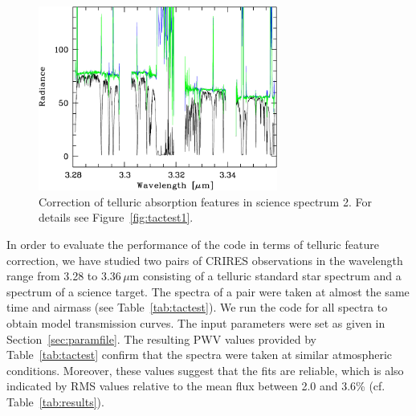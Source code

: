 \begin{figure}
\centering
\includegraphics[width=0.7\textwidth,clip=true]
{figures/mfd_tactest2.pdf}
\caption[]{Correction of telluric absorption features in science spectrum 2.
For details see Figure~\ref{fig:tactest1}.}
\label{fig:tactest2}
\end{figure}

In order to evaluate the performance of the code in terms of telluric feature
correction, we have studied two pairs of CRIRES observations in the wavelength
range from 3.28 to 3.36\,$\mu$m consisting of a telluric standard star spectrum
and a spectrum of a science target. The spectra of a pair were taken at almost
the same time and airmass (see Table~\ref{tab:tactest}). We run the code for
all spectra to obtain model transmission curves. The input parameters were set
as given in Section~\ref{sec:paramfile}. The resulting PWV values provided by
Table~\ref{tab:tactest} confirm that the spectra were taken at similar
atmospheric conditions. Moreover, these values suggest that the fits are
reliable, which is also indicated by RMS values relative to the mean flux
between 2.0 and 3.6\% (cf. Table~\ref{tab:results}).

